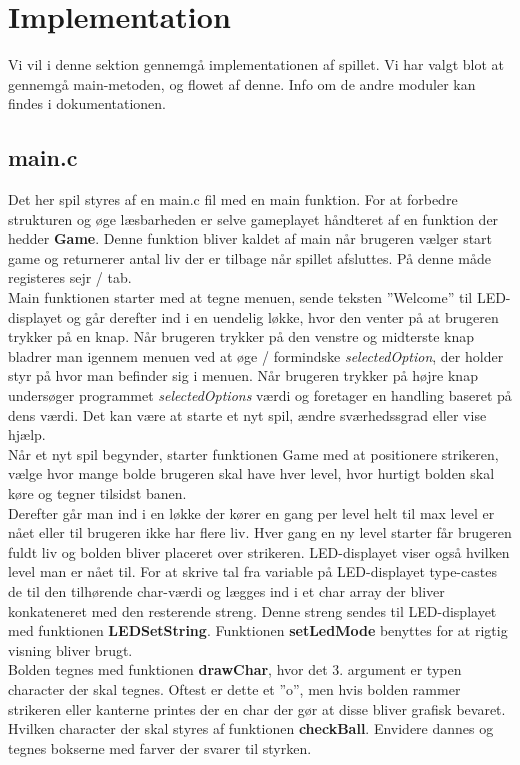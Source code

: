 \section{Implementation}
Vi vil i denne sektion gennemgå implementationen af spillet. Vi har valgt blot at gennemgå main-metoden, og flowet af denne. Info om de andre moduler kan findes i dokumentationen.
\subsection{main.c}
Det her spil styres af en main.c fil med en main funktion. For at forbedre strukturen og øge læsbarheden er selve gameplayet håndteret af en funktion der hedder \textbf{Game}. Denne funktion bliver kaldet af main når brugeren vælger start game og returnerer antal liv der er tilbage når spillet afsluttes. På denne måde registeres sejr /  tab. \\
Main funktionen starter med at tegne menuen, sende teksten ”Welcome” til LED-displayet og går derefter ind i en uendelig løkke, hvor den venter på at brugeren trykker  på en knap. Når brugeren trykker på den venstre  og  midterste knap bladrer man igennem menuen ved at øge / formindske \textit{selectedOption}, der holder styr på hvor man befinder sig i menuen. Når brugeren trykker på højre knap undersøger programmet \textit{selectedOptions} værdi og foretager en handling baseret på dens værdi. Det kan være at starte et nyt spil, ændre sværhedssgrad eller vise hjælp.\\
Når et nyt spil begynder, starter funktionen Game med at positionere strikeren, vælge hvor mange bolde brugeren skal have hver level, hvor hurtigt bolden skal køre og tegner tilsidst banen. \\ Derefter går man ind i en løkke der kører en gang per level helt til max level er nået eller til brugeren ikke har flere liv. Hver gang en ny level starter får brugeren fuldt liv og bolden bliver placeret over strikeren. LED-displayet viser også hvilken level man er nået til. For at skrive tal fra variable på LED-displayet type-castes de til den tilhørende char-værdi og lægges ind i et char array der bliver konkateneret med den resterende streng. Denne streng sendes  til LED-displayet med funktionen \textbf{LEDSetString}. Funktionen \textbf{setLedMode} benyttes for at rigtig visning bliver brugt.\\
Bolden tegnes med funktionen \textbf{drawChar}, hvor det 3. argument er typen character der skal tegnes. Oftest er dette et ”o”, men hvis bolden rammer strikeren eller kanterne printes  der en char der gør at disse bliver grafisk bevaret. Hvilken character der skal styres af funktionen \textbf{checkBall}. Envidere dannes og tegnes bokserne med farver der svarer til styrken.\\
